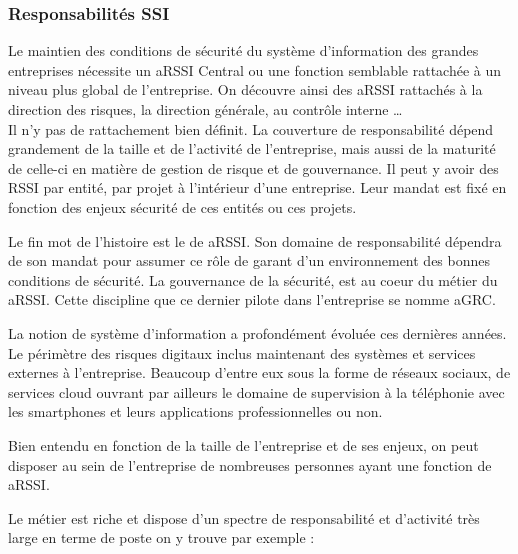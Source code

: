 \subsubsection{Responsabilités SSI}

Le maintien des conditions de sécurité du système d'information des grandes entreprises nécessite un \gls{aRSSI} Central ou une fonction semblable rattachée à un niveau plus global de l'entreprise.
On découvre ainsi des  \gls{aRSSI} rattachés à la direction des risques, la direction générale, au contrôle interne …\\
 Il n'y pas de rattachement bien définit. La couverture de responsabilité dépend grandement de la taille et de l'activité de l'entreprise, mais aussi de la maturité de celle-ci en matière de gestion de risque et de gouvernance. Il peut y avoir des RSSI par entité, par projet à l’intérieur d'une entreprise. Leur mandat est fixé en fonction des enjeux sécurité de ces entités ou ces projets. 

Le fin mot de l'histoire est le  de  \gls{aRSSI}. Son domaine de responsabilité dépendra de son mandat pour assumer ce rôle de garant d'un environnement  des bonnes conditions de sécurité.
La gouvernance de la sécurité, est au coeur du métier du  \gls{aRSSI}. Cette discipline que ce dernier pilote dans l’entreprise se nomme \gls{aGRC}.

La notion de système d'information a profondément évoluée ces dernières années. Le périmètre des risques digitaux inclus maintenant des systèmes et services externes à l'entreprise. Beaucoup d'entre eux sous la forme de réseaux sociaux, de services cloud ouvrant par ailleurs le domaine de supervision à la téléphonie avec les smartphones et leurs applications professionnelles ou non.

Bien entendu en fonction de la taille de l'entreprise et de ses enjeux, on peut disposer au sein de l'entreprise de nombreuses personnes ayant une fonction de \gls{aRSSI}. 

Le métier est riche et dispose d'un spectre de responsabilité et d'activité très large en terme de poste on y trouve par exemple :

